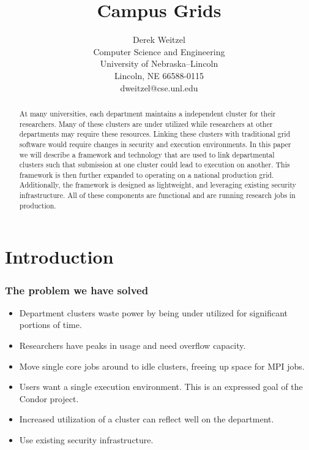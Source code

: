 \documentclass[11pt]{article}
\title{\bf Campus Grids}
\author{Derek Weitzel\\
Computer Science and Engineering\\
University of Nebraska--Lincoln\\
Lincoln, NE 66588-0115\\
dweitzel@cse.unl.edu
       }
\begin{document}
\maketitle

\begin{abstract}

At many universities, each department maintains a independent cluster for their researchers.  Many of these clusters are under utilized while researchers at other departments may require these resources.  Linking these clusters with traditional grid software would require changes in security and execution environments.  In this paper we will describe a framework and technology that are used to link departmental clusters such that submission at one cluster could lead to execution on another.  This framework is then further expanded to operating on a national production grid.  Additionally, the framework is designed as lightweight, and leveraging existing security infrastructure.   All of these components are functional and are running research jobs in production.

\end{abstract}



\section{Introduction}
\label{sec:Introduction}

\subsubsection* {The problem we have solved}

\begin{itemize}

\item Department clusters waste power by being under utilized for significant portions of time.
\item Researchers have peaks in usage and need overflow capacity.
\item Move single core jobs around to idle clusters, freeing up space for MPI jobs.
\item Users want a single execution environment.  This is an expressed goal of the Condor project.
\item Increased utilization of a cluster can reflect well on the department.
\item Use existing security infrastructure.


\end{itemize}
\end{document}

